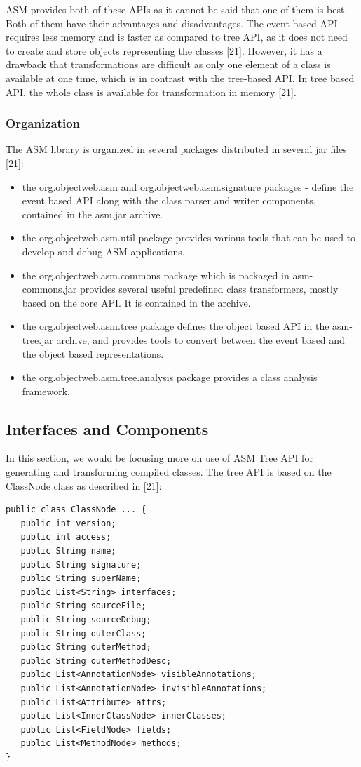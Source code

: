 ASM provides both of these APIs as it cannot be said that one of them is best. Both of them have their advantages and disadvantages. The event based API requires less memory and is faster as compared to tree API, as it does not need to create and store objects representing the classes [21]. However, it has a drawback that transformations are difficult as only one element of a class is available at one time, which is in contrast with the tree-based API. In tree based API, the whole class is available for transformation in memory [21].

\subsubsection{Organization}
The ASM library is organized in several packages distributed in several jar files [21]:
\begin{itemize}
\item the org.objectweb.asm and org.objectweb.asm.signature packages - define the event based API along with the class parser and writer components, contained in the asm.jar archive. 
\item the org.objectweb.asm.util package provides various tools that can be used to develop and debug ASM applications. 
\item the org.objectweb.asm.commons package which is packaged in asm-commons.jar provides several useful predefined class transformers, mostly based on the core API. It is contained in the archive. 
\item the org.objectweb.asm.tree package defines the object based API in the asm-tree.jar archive, and provides tools to convert between the event based and the object based representations. 
\item the org.objectweb.asm.tree.analysis package provides a class analysis framework.
\end{itemize}



\subsection{Interfaces and Components}
In this section, we would be focusing more on use of ASM Tree API for generating and transforming compiled classes. The tree API is based on the ClassNode class as described in [21]:
\begin{verbatim}
public class ClassNode ... {
   public int version;
   public int access;
   public String name;
   public String signature;
   public String superName;
   public List<String> interfaces;
   public String sourceFile;
   public String sourceDebug;
   public String outerClass;
   public String outerMethod;
   public String outerMethodDesc;
   public List<AnnotationNode> visibleAnnotations;
   public List<AnnotationNode> invisibleAnnotations;
   public List<Attribute> attrs;
   public List<InnerClassNode> innerClasses;
   public List<FieldNode> fields;
   public List<MethodNode> methods;
}
\end{verbatim}

